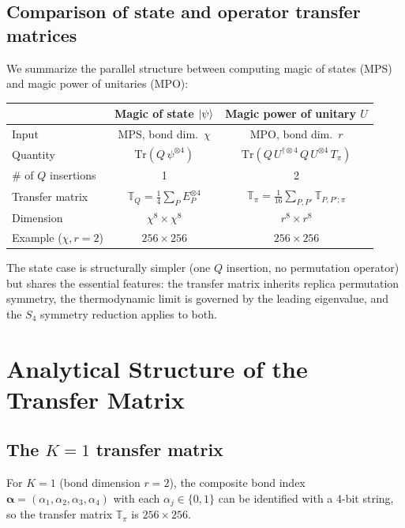 \documentclass[11pt,a4paper]{article}
\theoremstyle{definition}
\theoremstyle{remark}
\renewcommand{\Tr}{\mathrm{Tr}}
\begin{document}
\subsection{Comparison of state and operator transfer matrices}

We summarize the parallel structure between computing magic of states (MPS) and magic power of unitaries (MPO):

\medskip
\begin{center}
\renewcommand{\arraystretch}{1.5}
\begin{tabular}{lcc}
  \toprule
  & \textbf{Magic of state} $\ket{\psi}$ & \textbf{Magic power of unitary} $U$ \\
  \midrule
  Input & MPS, bond dim.\ $\chi$ & MPO, bond dim.\ $r$ \\[3pt]
  Quantity & $\Tr(Q\,\psi^{\otimes 4})$ & $\Tr(Q\,U^{\dagger\otimes 4}\,Q\,U^{\otimes 4}\,T_\pi)$ \\[3pt]
  \# of $Q$ insertions & 1 & 2 \\[3pt]
  Transfer matrix & $\mathbb{T}_Q = \tfrac{1}{4}\sum_P E_P^{\otimes 4}$ &
    $\mathbb{T}_\pi = \tfrac{1}{16}\sum_{P,P'} \mathbb{T}_{P,P';\pi}$ \\[3pt]
  Dimension & $\chi^8\times\chi^8$ & $r^8\times r^8$ \\[3pt]
  Example ($\chi,r=2$) & $256\times 256$ & $256\times 256$ \\
  \bottomrule
\end{tabular}
\end{center}
\medskip

The state case is structurally simpler (one $Q$ insertion, no permutation operator) but shares the essential features: the transfer matrix inherits replica permutation symmetry, the thermodynamic limit is governed by the leading eigenvalue, and the $S_4$ symmetry reduction applies to both.

\section{Analytical Structure of the Transfer Matrix}
\label{sec:analytical}

\subsection{The $K=1$ transfer matrix}

For $K=1$ (bond dimension $r=2$), the composite bond index $\boldsymbol{\alpha}=(\alpha_1,\alpha_2,\alpha_3,\alpha_4)$ with each $\alpha_j\in\{0,1\}$ can be identified with a 4-bit string, so the transfer matrix $\mathbb{T}_\pi$ is $256\times 256$.
\end{document}

